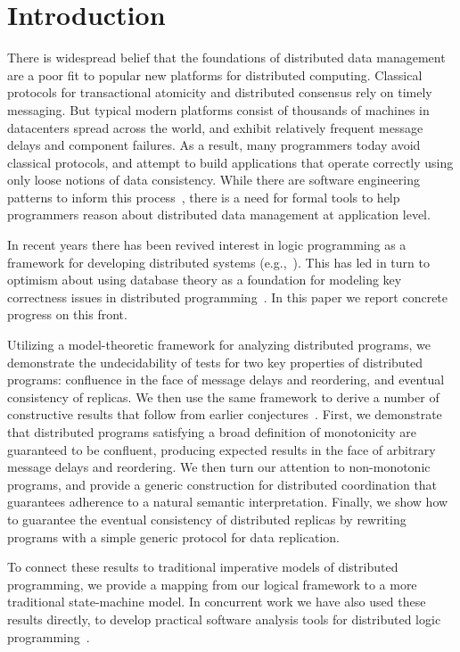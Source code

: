 \section{Introduction}
There is widespread belief that the foundations of distributed data management are a poor fit to popular new platforms for distributed computing. Classical protocols for transactional atomicity and distributed consensus rely on timely messaging. But typical modern platforms consist of thousands of machines in datacenters spread across the world, and exhibit relatively frequent message delays and component failures.  As a result, many programmers today avoid classical protocols, and attempt to build applications that operate correctly using only loose notions of data consistency.  While there are software engineering patterns to inform this process~\cite{}, there is a need for formal tools to help programmers reason about distributed data management at application level.

In recent years there has been revived interest in logic programming as a framework for developing distributed systems (e.g.,~\cite{reactors,boom}).  This has led in turn to optimism about using database theory as a foundation for modeling key correctness issues in distributed programming~\cite{podskey-sigrec}.
In this paper we report concrete progress on this front.  

Utilizing a model-theoretic framework for analyzing distributed programs, we demonstrate the undecidability of tests for two key properties of distributed programs: confluence in the face of message delays and reordering, and eventual consistency of replicas.  We then use the same framework to derive a number of constructive results that follow from earlier conjectures~\cite{podskey-sigrec}.
First, we demonstrate that distributed programs satisfying a broad definition of  monotonicity are guaranteed to be confluent, producing expected results in the face of arbitrary message delays and reordering.  We then turn our attention to non-monotonic programs, and provide a generic construction for distributed coordination that guarantees adherence to a natural semantic interpretation.  Finally, we show how to guarantee the eventual consistency of distributed replicas by rewriting programs with a simple generic protocol for data replication.

To connect these results to traditional imperative models of distributed programming, we provide a mapping from our logical framework to a more traditional state-machine model.  In concurrent work we have also used these results directly, to develop practical software analysis tools for distributed logic programming~\cite{cidr11}.  

